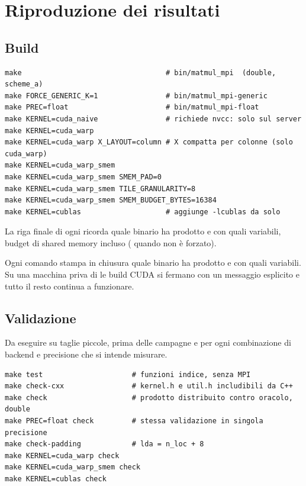 \chapter{Riproduzione dei risultati}
\label{app:riproducibilita}

\section{Build}

\begin{lstlisting}[language=shell,caption={Compilazione delle configurazioni usate nelle campagne.}]
make                                  # bin/matmul_mpi  (double, scheme_a)
make FORCE_GENERIC_K=1                # bin/matmul_mpi-generic
make PREC=float                       # bin/matmul_mpi-float
make KERNEL=cuda_naive                # richiede nvcc: solo sul server
make KERNEL=cuda_warp
make KERNEL=cuda_warp X_LAYOUT=column # X compatta per colonne (solo cuda_warp)
make KERNEL=cuda_warp_smem
make KERNEL=cuda_warp_smem SMEM_PAD=0
make KERNEL=cuda_warp_smem TILE_GRANULARITY=8
make KERNEL=cuda_warp_smem SMEM_BUDGET_BYTES=16384
make KERNEL=cublas                    # aggiunge -lcublas da solo
\end{lstlisting}

La riga finale di ogni  ricorda quale binario ha prodotto e con quali
variabili, budget di shared memory incluso ( quando non \`e
forzato).

Ogni comando stampa in chiusura quale binario ha prodotto e con quali variabili.
Su una macchina priva di  le build CUDA si fermano con un messaggio
esplicito e tutto il resto continua a funzionare.

\section{Validazione}

Da eseguire su taglie piccole, prima delle campagne e per ogni combinazione di
backend e precisione che si intende misurare.

\begin{lstlisting}[language=shell]
make test                     # funzioni indice, senza MPI
make check-cxx                # kernel.h e util.h includibili da C++
make check                    # prodotto distribuito contro oracolo, double
make PREC=float check         # stessa validazione in singola precisione
make check-padding            # lda = n_loc + 8
make KERNEL=cuda_warp check
make KERNEL=cuda_warp_smem check
make KERNEL=cublas check
\end{lstlisting}

